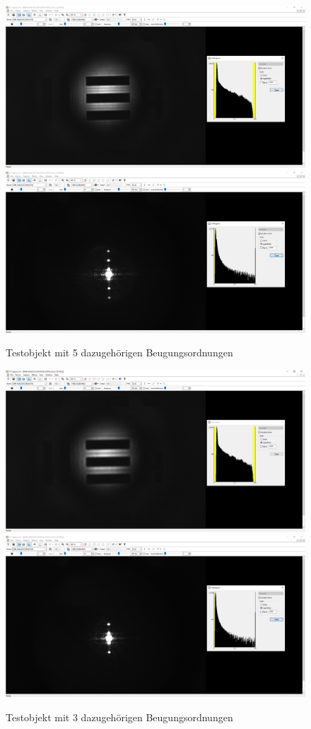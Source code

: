 \documentclass[12pt,a4paper,twoside]{article}
\begin{document}
\begin{figure}[H]
    \centering
    \includegraphics[width=0.45\linewidth]{nudes/AbbeTheorie/Aufgabe 2/horizontal/5te ohne.PNG}
    \includegraphics[width=0.45\linewidth]{nudes/AbbeTheorie/Aufgabe 2/horizontal/5te mit.PNG}
    \caption{Testobjekt mit 5 dazugehörigen Beugungsordnungen}
    \label{fig:Aufabe2-5O}
\end{figure}

\begin{figure}[H]
    \centering
    \includegraphics[width=0.45\linewidth]{nudes/AbbeTheorie/Aufgabe 2/horizontal/3te ohne.PNG}
    \includegraphics[width=0.45\linewidth]{nudes/AbbeTheorie/Aufgabe 2/horizontal/3te mit.PNG}
    \caption{Testobjekt mit 3 dazugehörigen Beugungsordnungen}
    \label{fig:Aufabe2-3O}
\end{figure}
\end{document}
